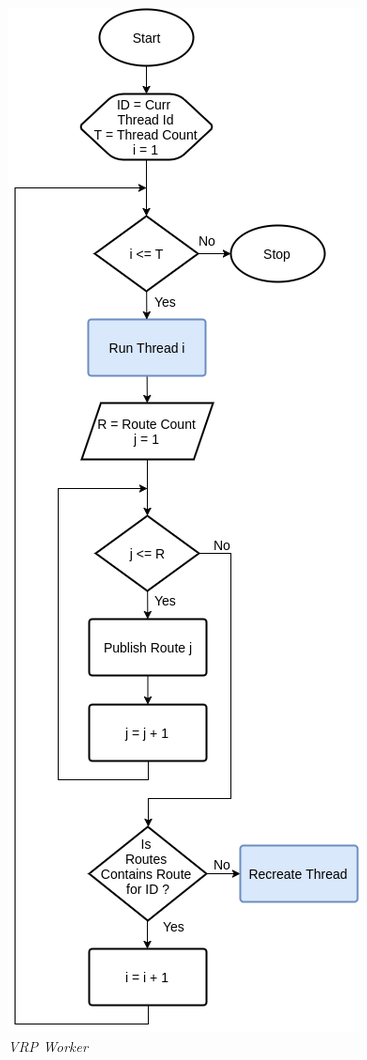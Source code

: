 \begin{figure}[!]
	\centering
	\includegraphics[width=\textwidth]{Resources/Images/recommendation-publisher}
	\caption{\textit{VRP Worker}}
	\label{fig:recommendation-publisher}
\end{figure}


